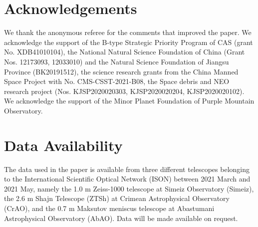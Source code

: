 \documentclass[fleqn,usenatbib]{mnras}
\begin{document}










% 


\section*{Acknowledgements}

We thank the anonymous referee for the comments that improved
the paper. We acknowledge the support of  the B-type Strategic Priority Program of CAS (grant No. XDB41010104), the National Natural Science Foundation of China (Grant Nos. 12173093, 12033010) and the Natural Science Foundation of Jiangsu Province (BK20191512), the science research grants from the China Manned Space Project with No. CMS-CSST-2021-B08, the Space debris and NEO research project (Nos. KJSP2020020303, KJSP2020020204, KJSP2020020102). We acknowledge the support of the Minor Planet Foundation of Purple Mountain Observatory. 

\section*{Data Availability}

The data used in the paper is available from three different telescopes belonging to the International Scientific Optical Network (ISON) between 2021 March and 2021 May, namely the 1.0 m Zeiss-1000 telescope at Simeiz Observatory (Simeiz), the 2.6 m Shajn Telescope (ZTSh) at Crimean Astrophysical Observatory (CrAO), and the 0.7 m Maksutov meniscus telescope at Abastumani Astrophysical Observatory (AbAO). Data will be made available on request. 




 


\end{document}
